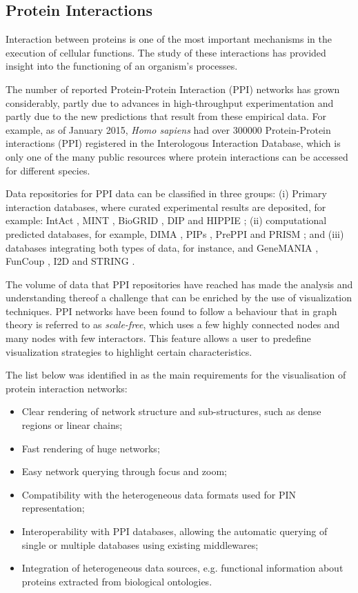 \subsection{Protein Interactions}
Interaction between proteins is one of the most important mechanisms in the execution of cellular functions. The study of these interactions has provided insight into the functioning of an organism's processes.

The number of reported Protein-Protein Interaction (PPI) networks has grown considerably, partly due to advances in high-throughput experimentation and partly due to the new predictions that result from these empirical data. For example, as of January 2015, \emph{Homo sapiens} had over 300000 Protein-Protein interactions (PPI) registered in the Interologous Interaction Database, which is only one of the many public resources where protein interactions can be accessed for different species. 

Data repositories for PPI data can be classified in three groups: (i) Primary interaction databases, where curated experimental results are deposited, for example: IntAct \cite{KER2012}, MINT \cite{LIC2012}, BioGRID \cite{STA2006}, DIP \cite{SAL2004}  and HIPPIE \cite{SCH2012}; (ii) computational predicted databases, for example, DIMA \cite{LUO2011}, PIPs \cite{MCD2009}, PrePPI \cite{ZHA2012} and PRISM \cite{OGM2005}; and  (iii) databases integrating both types of data, for instance, and GeneMANIA \cite{WAR2010}, FunCoup \cite{SCH2014}, I2D \cite{NIU2010} and STRING \cite{SZK2014}.

The volume of data that PPI repositories have reached has made the analysis and understanding thereof a challenge that can be enriched by the use of visualization techniques. PPI networks have been found to follow a behaviour that in graph theory is referred to as \emph{scale-free}, which uses a few highly connected nodes and many nodes with few interactors. This feature allows a user to predefine visualization strategies to highlight certain characteristics.

The list below was identified in \cite{AGA2013} as the main requirements for the visualisation of protein interaction networks:
\begin{itemize}
\setlength\itemsep{-0.3em}
	\item Clear rendering of network structure and sub-structures, such as dense regions or linear chains;
	\item Fast rendering of huge networks;
	\item Easy network querying through focus and zoom;
	\item Compatibility with the heterogeneous data formats used for PIN representation;
	\item Interoperability with PPI databases, allowing the automatic querying of single or multiple databases using existing middlewares;
	\item Integration of heterogeneous data sources, e.g. functional information about proteins extracted from biological ontologies.
\end{itemize}

